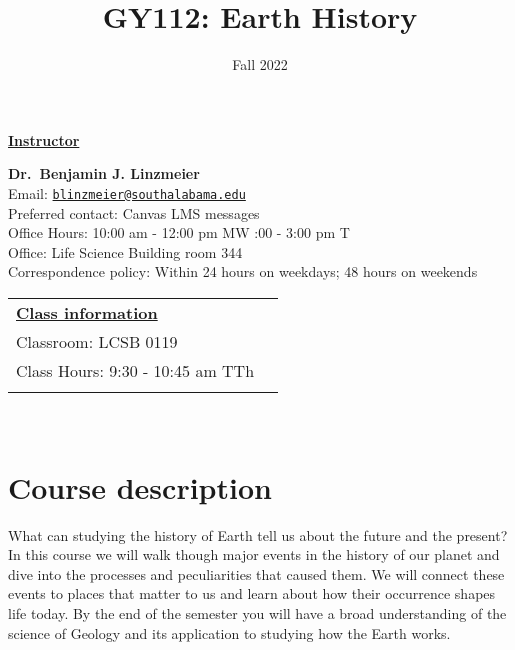 \documentclass[11pt,]{article}
\title{GY112: Earth History}
\date{Fall 2022}
\begin{document}
  

		\maketitle
		
	
		\thispagestyle{firststyle}

\textbf{\underline{Instructor}}
\begin{multicols}{2}

  \textbf{Dr.~Benjamin J. Linzmeier}\\
  Email: \href{mailto:blinzmeier@southalabama.edu}{\nolinkurl{blinzmeier@southalabama.edu}}\\
  Preferred contact: Canvas LMS messages\\
  Office Hours: 10:00 am - 12:00 pm MW :00 - 3:00 pm T\\
  Office: Life Science Building room 344\\
  Correspondence policy: Within 24 hours on weekdays; 48 hours on
weekends\\
    \columnbreak
    
  \end{multicols}
	
\noindent \begin{tabular*}{\textwidth}{ @{\extracolsep{\fill}} lr @{\extracolsep{\fill}}}
\textbf{\underline{Class information}}\\
  Classroom: LCSB 0119\\
  Class Hours: 9:30 - 10:45 am TTh\\
    \\
	\end{tabular*}\\


\vspace{2mm}


\hypertarget{course-description}{%
\section{Course description}\label{course-description}}

What can studying the history of Earth tell us about the future and the
present? In this course we will walk though major events in the history
of our planet and dive into the processes and peculiarities that caused
them. We will connect these events to places that matter to us and learn
about how their occurrence shapes life today. By the end of the semester
you will have a broad understanding of the science of Geology and its
application to studying how the Earth works.
\end{document}
